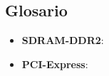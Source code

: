 \subsection{Glosario}

\begin{itemize}
\item \textbf{SDRAM-DDR2}:
\item \textbf{PCI-Express}:
\end{itemize}